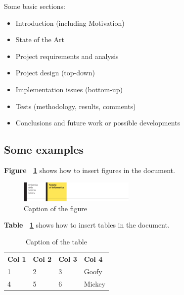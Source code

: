 \documentclass[]{usiinfbachelorproject}
\begin{document}
Some basic sections:
\begin{itemize}
\item Introduction (including Motivation)
\item State of the Art
\item Project requirements and analysis
\item Project design (top-down)
\item Implementation issues (bottom-up)
\item Tests (methodology, results, comments)
\item Conclusions and future work or possible developments
\end{itemize} 

\subsection {Some examples}

\textbf{Figure ~\ref{fig:USILogo}} shows how to insert figures in the document.

\begin{figure} [h]
\centering
\includegraphics[width=0.5\textwidth]{logoinfo.pdf}
\caption{Caption of the figure}
\label{fig:USILogo}
\end{figure}

\noindent\textbf{Table ~\ref{tab:numbers}} shows how to insert tables in the document.

\begin{table}[h]
\centering
{} {
\begin{normalsize}\begin{tabular}{l|lll}
\textbf{Col 1} & \textbf{Col 2} & \textbf{Col 3} & \textbf{Col 4}\\
\hline
1 & 2 & 3 & Goofy\\
4 & 5 & 6 & Mickey
\end{tabular}
\end{normalsize}
}
\caption{Caption of the table}
\label{tab:numbers}
\end{table}




\end{document}
